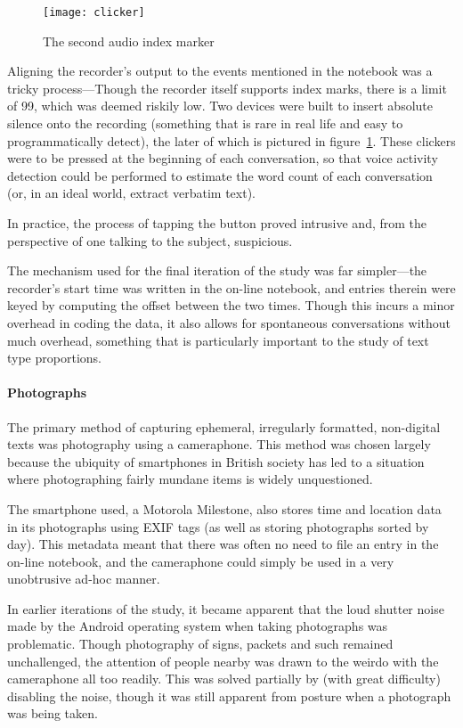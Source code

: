 \begin{figure}[p]
\centering
\texttt{[image: clicker]}
\caption{The second audio index marker}
\label{fig:personal:clicker}
\end{figure}


Aligning the recorder's output to the events mentioned in the notebook was a tricky process---Though the recorder itself supports index marks, there is a limit of 99, which was deemed riskily low.  Two devices were built to insert absolute silence onto the recording (something that is rare in real life and easy to programmatically detect), the later of which is pictured in figure~\ref{fig:personal:clicker}.  These clickers were to be pressed at the beginning of each conversation, so that voice activity detection could be performed to estimate the word count of each conversation (or, in an ideal world, extract verbatim text).

In practice, the process of tapping the button proved intrusive and, from the perspective of one talking to the subject, suspicious.

The mechanism used for the final iteration of the study was far simpler---the recorder's start time was written in the on-line notebook, and entries therein were keyed by computing the offset between the two times.  Though this incurs a minor overhead in coding the data, it also allows for spontaneous conversations without much overhead, something that is particularly important to the study of text type proportions.



\paragraph{Photographs}
The primary method of capturing ephemeral, irregularly formatted, non-digital texts was photography using a cameraphone.  This method was chosen largely because the ubiquity of smartphones in British society has led to a situation where photographing fairly mundane items is widely unquestioned.

The smartphone used, a Motorola Milestone, also stores time and location data in its photographs using EXIF tags (as well as storing photographs sorted by day).  This metadata meant that there was often no need to file an entry in the on-line notebook, and the cameraphone could simply be used in a very unobtrusive ad-hoc manner.

In earlier iterations of the study, it became apparent that the loud shutter noise made by the Android operating system when taking photographs was problematic.  Though photography of signs, packets and such remained unchallenged, the attention of people nearby was drawn to the weirdo with the cameraphone all too readily.  This was solved partially by (with great difficulty) disabling the noise, though it was still apparent from posture when a photograph was being taken.

